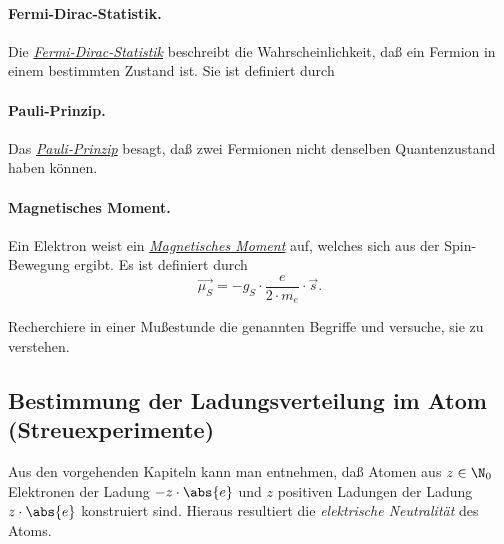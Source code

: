 \documentclass[]{subfiles}
\begin{document}
            \paragraph*{Fermi-Dirac-Statistik.} Die \href{https://de.wikipedia.org/wiki/Fermi-Dirac-Statistik}{\emph{Fermi-Dirac-Statistik}} beschreibt die Wahrscheinlichkeit, daß ein Fermion in einem bestimmten Zustand ist. Sie ist definiert durch 

            \paragraph*{Pauli-Prinzip.} Das \href{https://de.wikipedia.org/wiki/Pauli-Prinzip}{\emph{Pauli-Prinzip}} besagt, daß zwei Fermionen nicht denselben Quantenzustand haben können.

            \paragraph*{Magnetisches Moment.} Ein Elektron weist ein \href{https://de.wikipedia.org/wiki/Magnetisches_Moment}{\emph{Magnetisches Moment}} auf, welches sich aus der Spin-Bewegung ergibt. Es ist definiert durch
            \[\vec{\mu_S} = -g_S\cdot \frac{e}{2\cdot m_e}\cdot\vec{s}.\]

            \begin{Aufgabe}
                \nr{} Recherchiere in einer Mußestunde die genannten Begriffe und versuche, sie zu verstehen.
            \end{Aufgabe}

    \subsection{Bestimmung der Ladungsverteilung im Atom (Streuexperimente)}
        Aus den vorgehenden Kapiteln kann man entnehmen, daß Atomen aus $z\in\N_0$ Elektronen der Ladung $-z\cdot \abs{e}$ und $z$ positiven Ladungen der Ladung $z\cdot\abs{e}$ konstruiert sind. Hieraus resultiert die \emph{elektrische Neutralität} des Atoms. 
\end{document}

